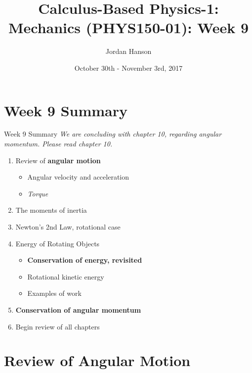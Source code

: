 \documentclass{beamer}
\title{Calculus-Based Physics-1: Mechanics (PHYS150-01): Week 9}
\date{October 30th - November 3rd, 2017}
\author{Jordan Hanson}
\institute{Whittier College Department of Physics and Astronomy}
\begin{document}
\maketitle

\section{Week 9 Summary}

\begin{frame}{Week 9 Summary}
\textit{We are concluding with chapter 10, regarding angular momentum. Please read chapter 10.}
\begin{enumerate}
\item Review of \textbf{angular motion}
\begin{itemize}
\item Angular velocity and acceleration
\item \textit{Torque}
\end{itemize}
\item \alert{The moments of inertia}
\item Newton's 2nd Law, rotational case
\item Energy of Rotating Objects
\begin{itemize}
\item \textbf{Conservation of energy, revisited}
\item Rotational kinetic energy
\item Examples of work
\end{itemize}
\item \textbf{\alert{Conservation of angular momentum}}
\item Begin review of all chapters
\end{enumerate}
\end{frame}

\section{Review of Angular Motion}
\end{document}
